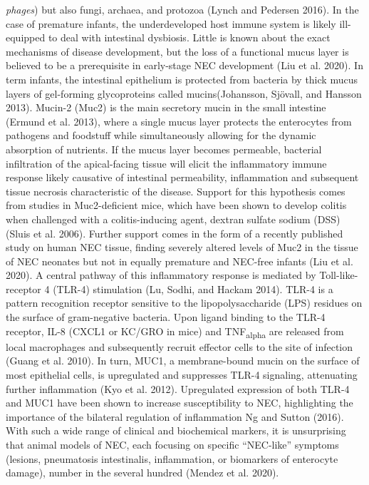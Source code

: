 \documentclass[
]{article}
\begin{document}
\emph{phages}) but also fungi, archaea, and protozoa (Lynch and Pedersen 2016). In the case of premature infants, the underdeveloped host immune system is likely ill-equipped to deal with intestinal dysbiosis. Little is known about the exact mechanisms of disease development, but the loss of a functional mucus layer is believed to be a prerequisite in early-stage NEC development (Liu et al. 2020). In term infants, the intestinal epithelium is protected from bacteria by thick mucus layers of gel-forming glycoproteins called mucins(Johansson, Sjövall, and Hansson 2013). Mucin-2 (Muc2) is the main secretory mucin in the small intestine (Ermund et al. 2013), where a single mucus layer protects the enterocytes from pathogens and foodstuff while simultaneously allowing for the dynamic absorption of nutrients. If the mucus layer becomes permeable, bacterial infiltration of the apical-facing tissue will elicit the inflammatory immune response likely causative of intestinal permeability, inflammation and subsequent tissue necrosis characteristic of the disease. Support for this hypothesis comes from studies in Muc2-deficient mice, which have been shown to develop colitis when challenged with a colitis-inducing agent, dextran sulfate sodium (DSS) (Sluis et al. 2006). Further support comes in the form of a recently published study on human NEC tissue, finding severely altered levels of Muc2 in the tissue of NEC neonates but not in equally premature and NEC-free infants (Liu et al. 2020). A central pathway of this inflammatory response is mediated by Toll-like-receptor 4 (TLR-4) stimulation (Lu, Sodhi, and Hackam 2014). TLR-4 is a pattern recognition receptor sensitive to the lipopolysaccharide (LPS) residues on the surface of gram-negative bacteria. Upon ligand binding to the TLR-4 receptor, IL-8 (CXCL1 or KC/GRO in mice) and TNF\textsubscript{alpha} are released from local macrophages and subsequently recruit effector cells to the site of infection (Guang et al. 2010). In turn, MUC1, a membrane-bound mucin on the surface of most epithelial cells, is upregulated and suppresses TLR-4 signaling, attenuating further inflammation (Kyo et al. 2012). Upregulated expression of both TLR-4 and MUC1 have been shown to increase susceptibility to NEC, highlighting the importance of the bilateral regulation of inflammation Ng and Sutton (2016). With such a wide range of clinical and biochemical markers, it is unsurprising that animal models of NEC, each focusing on specific ``NEC-like'' symptoms (lesions, pneumatosis intestinalis, inflammation, or biomarkers of enterocyte damage), number in the several hundred (Mendez et al. 2020).
\end{document}
